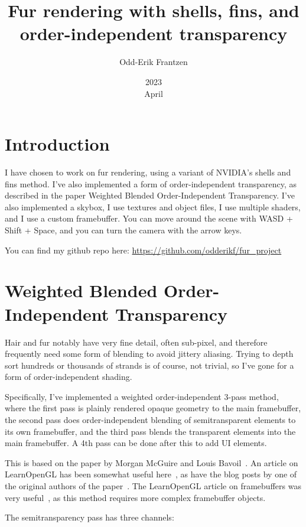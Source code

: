 \documentclass[a4paper, 12pt]{article}
\title{Fur rendering with shells, fins, and order-independent transparency}
\date{2023\\ April}
\author{Odd-Erik Frantzen}
\begin{document}
    \maketitle
    \section{Introduction}
    I have chosen to work on fur rendering,
    using a variant of NVIDIA's shells and fins method.
    I've also implemented a form of order-independent transparency,
    as described in the paper Weighted Blended Order-Independent Transparency.
    I've also implemented a skybox, I use textures and object files, I use multiple shaders,
    and I use a custom framebuffer.
    You can move around the scene with WASD + Shift + Space,
    and you can turn the camera with the arrow keys.

    You can find my github repo here: \url{https://github.com/odderikf/fur_project}

    \section{Weighted Blended Order-Independent Transparency}

    Hair and fur notably have very fine detail, often sub-pixel,
    and therefore frequently need some form of blending to avoid jittery aliasing.
    Trying to depth sort hundreds or thousands of strands is of course, not trivial,
    so I've gone for a form of order-independent shading.

    Specifically, I've implemented a weighted order-independent 3-pass method,
    where the first pass is plainly rendered opaque geometry to the main framebuffer,
    the second pass does order-independent blending of semitransparent elements
    to its own framebuffer,
    and the third pass blends the transparent elements into the main framebuffer.
    A 4th pass can be done after this to add UI elements.

    This is based on the paper by Morgan McGuire and Louis Bavoil~\cite{McGuire2013Transparency}.
    An article on LearnOpenGL has been somewhat useful here~\cite{learnblended},
    as have the blog posts by one of the original authors of the paper~\cite{blendedblog1,blendedblog2,blendedblog3}.
    The LearnOpenGL article on framebuffers was very useful~\cite{learnframebuffers},
    as this method requires more complex framebuffer objects.

    The semitransparency pass has three channels:
\end{document}
